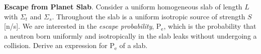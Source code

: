\begin{exercises}
  \item \label{itm:escapeprobability} \textbf{Escape from Planet Slab}. 
    Consider a uniform homogeneous slab 
    of length $L$ with $\Sigma_t$  and $\Sigma_s$. Throughout the slab is 
    a uniform isotropic source of strength $S$ [n/s]. 
    We are interested in the \textit{escape probability}, P$_{\text{e}}$,
    which is the probability that a neutron born uniformly 
    and isotropically in the slab leaks without undergoing
    a collision.  Derive an expression for  P$_{\text{e}}$ of a slab.

\end{exercises}
